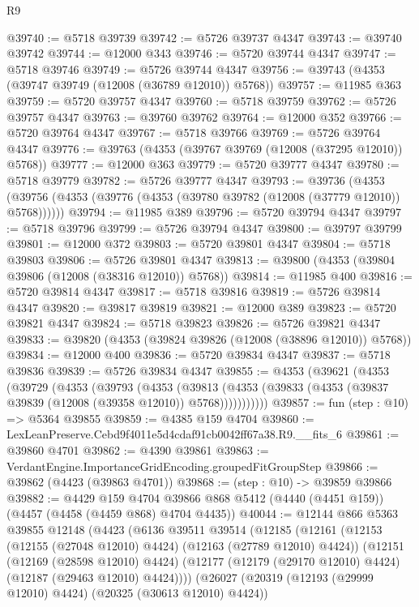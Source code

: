 \begin{lexlean}{R9}
\begin{coremodule}
@39740 := @5718 @39739
@39742 := @5726 @39737 @4347
@39743 := @39740 @39742
@39744 := @12000 @343
@39746 := @5720 @39744 @4347
@39747 := @5718 @39746
@39749 := @5726 @39744 @4347
@39756 := @39743 (@4353 (@39747 @39749 (@12008 (@36789 @12010)) @5768))
@39757 := @11985 @363
@39759 := @5720 @39757 @4347
@39760 := @5718 @39759
@39762 := @5726 @39757 @4347
@39763 := @39760 @39762
@39764 := @12000 @352
@39766 := @5720 @39764 @4347
@39767 := @5718 @39766
@39769 := @5726 @39764 @4347
@39776 := @39763 (@4353 (@39767 @39769 (@12008 (@37295 @12010)) @5768))
@39777 := @12000 @363
@39779 := @5720 @39777 @4347
@39780 := @5718 @39779
@39782 := @5726 @39777 @4347
@39793 := @39736
    (@4353 (@39756 (@4353 (@39776 (@4353 (@39780 @39782 (@12008 (@37779 @12010)) @5768))))))
@39794 := @11985 @389
@39796 := @5720 @39794 @4347
@39797 := @5718 @39796
@39799 := @5726 @39794 @4347
@39800 := @39797 @39799
@39801 := @12000 @372
@39803 := @5720 @39801 @4347
@39804 := @5718 @39803
@39806 := @5726 @39801 @4347
@39813 := @39800 (@4353 (@39804 @39806 (@12008 (@38316 @12010)) @5768))
@39814 := @11985 @400
@39816 := @5720 @39814 @4347
@39817 := @5718 @39816
@39819 := @5726 @39814 @4347
@39820 := @39817 @39819
@39821 := @12000 @389
@39823 := @5720 @39821 @4347
@39824 := @5718 @39823
@39826 := @5726 @39821 @4347
@39833 := @39820 (@4353 (@39824 @39826 (@12008 (@38896 @12010)) @5768))
@39834 := @12000 @400
@39836 := @5720 @39834 @4347
@39837 := @5718 @39836
@39839 := @5726 @39834 @4347
@39855 := @4353
    (@39621
      (@4353
        (@39729
          (@4353
            (@39793
              (@4353
                (@39813
                  (@4353 (@39833 (@4353 (@39837 @39839 (@12008 (@39358 @12010)) @5768)))))))))))
@39857 := fun (step : @10) => @5364 @39855
@39859 := @4385 @159 @4704
@39860 := LexLeanPreserve.Cebd9f4011e5d4cdaf91cb0042ff67a38.R9.__fits_6
@39861 := @39860 @4701
@39862 := @4390 @39861
@39863 := VerdantEngine.ImportanceGridEncoding.groupedFitGroupStep
@39866 := @39862 (@4423 (@39863 @4701))
@39868 := (step : @10) -> @39859 @39866
@39882 := @4429
    @159
    @4704
    @39866
    @868
    @5412
    (@4440 (@4451 @159))
    (@4457 (@4458 (@4459 @868) @4704 @4435))
@40044 := @12144
    @866
    @5363
    @39855
    @12148
    (@4423
      (@6136
        @39511
        @39514
        (@12185
          (@12161
            (@12153 (@12155 (@27048 @12010) @4424) (@12163 (@27789 @12010) @4424))
            (@12151
              (@12169 (@28598 @12010) @4424)
              (@12177 (@12179 (@29170 @12010) @4424) (@12187 (@29463 @12010) @4424))))
          (@26027
            (@20319 (@12193 (@29999 @12010) @4424) (@20325 (@30613 @12010) @4424))

\end{coremodule}
\end{lexlean}
